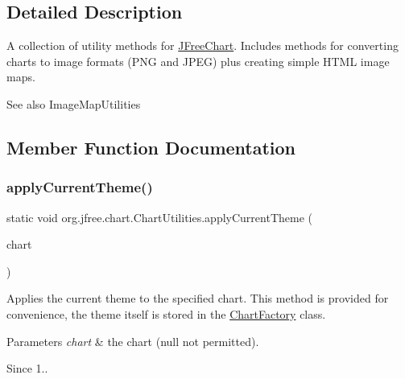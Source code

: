 \subsection{Detailed Description}
A collection of utility methods for \mbox{\hyperlink{classorg_1_1jfree_1_1chart_1_1_j_free_chart}{J\+Free\+Chart}}. Includes methods for converting charts to image formats (P\+NG and J\+P\+EG) plus creating simple H\+T\+ML image maps.

\begin{DoxySeeAlso}{See also}
Image\+Map\+Utilities 
\end{DoxySeeAlso}


\subsection{Member Function Documentation}
\mbox{\label{classorg_1_1jfree_1_1chart_1_1_chart_utilities_a2689d5e3124cb8d038a61cd8f2f68d51}} 
\subsubsection{\texorpdfstring{apply\+Current\+Theme()}{applyCurrentTheme()}}
{\footnotesize\ttfamily static void org.\+jfree.\+chart.\+Chart\+Utilities.\+apply\+Current\+Theme (\begin{DoxyParamCaption}\item[{\mbox{\hyperlink{classorg_1_1jfree_1_1chart_1_1_j_free_chart}{J\+Free\+Chart}}}]{chart }\end{DoxyParamCaption})\hspace{0.3cm}{\ttfamily [static]}}

Applies the current theme to the specified chart. This method is provided for convenience, the theme itself is stored in the \mbox{\hyperlink{classorg_1_1jfree_1_1chart_1_1_chart_factory}{Chart\+Factory}} class.


\begin{DoxyParams}{Parameters}
{\em chart} & the chart ({\ttfamily null} not permitted).\\
\hline
\end{DoxyParams}
\begin{DoxySince}{Since}
1.. 
\end{DoxySince}
\mbox{\label{classorg_1_1jfree_1_1chart_1_1_chart_utilities_aa02ad68b741fa60568d98b9091aa2fc8}} 
